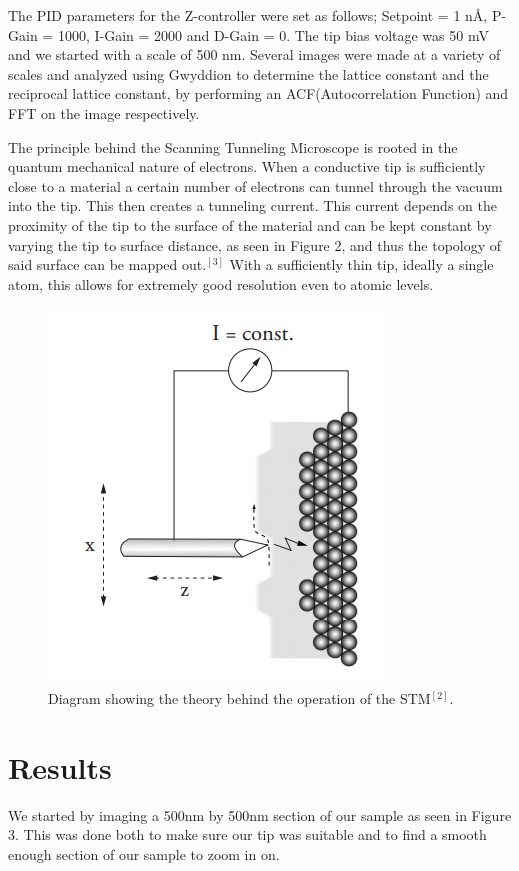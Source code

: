 \documentclass{article}
\begin{document}
The PID parameters for the Z-controller were set as follows; Setpoint = 1 n{\AA}, P-Gain = 1000, I-Gain = 2000 and D-Gain = 0.  The tip bias voltage was 50 mV and we started with a scale of 500 nm.  Several images were made at a variety of scales and analyzed using Gwyddion to determine the lattice constant and the reciprocal lattice constant, by performing an ACF(Autocorrelation Function) and FFT on the image respectively.

The principle behind the Scanning Tunneling Microscope is rooted in the quantum mechanical nature of electrons. When a conductive tip is sufficiently close to a material a certain number of electrons can tunnel through the vacuum into the tip.  This then creates a tunneling current.  This current depends on the proximity of the tip to the surface of the material and can be kept constant by varying the tip to surface distance, as seen in Figure 2, and thus the topology of said surface can be mapped out.$^{[3]}$  With a sufficiently thin tip, ideally a single atom, this allows for extremely good resolution even to atomic levels. 

\begin{figure}[H]
\includegraphics[scale=.7,center]{STMDiagram.PNG}
\caption{Diagram showing the theory behind the operation of the STM$^{[2]}$.}
\end{figure}


\section{Results}

We started by imaging a 500nm by 500nm section of our sample as seen in Figure 3.  This was done both to make sure our tip was suitable and to find a smooth enough section of our sample to zoom in on.
\end{document}
